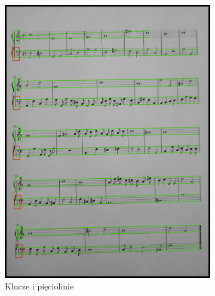 \documentclass[12pt]{article}
\begin{document}
		\begin{figure}[h!]
			\centering
			\begin{subfigure}[b]{0.32\linewidth}
				\includegraphics[width=\linewidth]{zdj/step_1.jpg}
				\caption{Klucze i pięciolinie}
			\end{subfigure}
			\begin{subfigure}[b]{0.32\linewidth}

\end{subfigure}
\end{figure}
\end{document}
